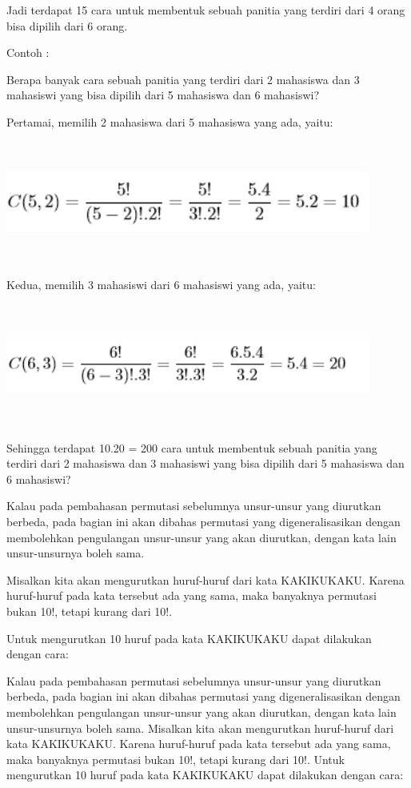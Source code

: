 \documentclass[11pt,fleqn]{book} %
\begin{document}
Jadi terdapat 15 cara untuk membentuk sebuah panitia yang terdiri dari 4 orang bisa dipilih dari 6 orang.

Contoh :

Berapa banyak cara sebuah panitia yang terdiri dari 2 mahasiswa dan 3 mahasiswi yang bisa dipilih dari 5 mahasiswa dan 6 mahasiswi?

Pertamai, memilih 2 mahasiswa dari 5 mahasiswa yang ada, yaitu:

\includegraphics[width = 12cm, height= 4cm]{Pictures/herlin10.png}

Kedua, memilih 3 mahasiswi dari 6 mahasiswi yang ada, yaitu:


\includegraphics[width = 12cm, height= 4cm]{Pictures/herlin11.png}

Sehingga terdapat 10.20 = 200 cara untuk membentuk sebuah panitia yang terdiri dari 2 mahasiswa dan 3 mahasiswi yang bisa dipilih dari 5 mahasiswa dan 6 mahasiswi?

Kalau pada pembahasan permutasi sebelumnya unsur-unsur yang diurutkan berbeda, pada bagian ini akan dibahas permutasi yang digeneralisasikan dengan membolehkan pengulangan unsur-unsur yang akan diurutkan, dengan kata lain unsur-unsurnya boleh sama.



Misalkan kita akan mengurutkan huruf-huruf dari kata KAKIKUKAKU. Karena huruf-huruf pada kata tersebut ada yang sama, maka banyaknya permutasi bukan 10!, tetapi kurang dari 10!.


Untuk mengurutkan 10 huruf pada kata KAKIKUKAKU dapat dilakukan dengan cara:

Kalau pada pembahasan permutasi sebelumnya unsur-unsur yang diurutkan berbeda, pada bagian ini akan dibahas permutasi yang digeneralisasikan dengan membolehkan pengulangan unsur-unsur yang akan diurutkan, dengan kata lain unsur-unsurnya boleh sama.
Misalkan kita akan mengurutkan huruf-huruf dari kata KAKIKUKAKU. Karena huruf-huruf pada kata tersebut ada yang sama, maka banyaknya permutasi bukan 10!, tetapi kurang dari 10!.
Untuk mengurutkan 10 huruf pada kata KAKIKUKAKU dapat dilakukan dengan cara:
\end{document}
